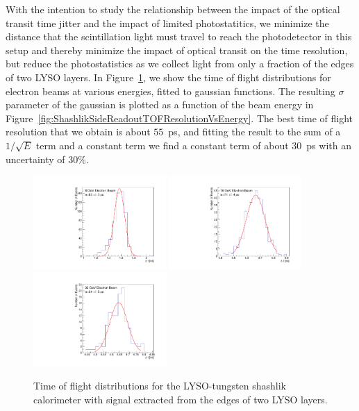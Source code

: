 \documentclass[11pt]{article}
\begin{document}
{With the intention to study the relationship between the impact of the 
optical transit time jitter and the impact of limited photostatitics,
we minimize the distance that the scintillation light
must travel to reach the photodetector in this setup and thereby minimize the
impact of optical transit on the time resolution, but reduce the photostatistics 
as we collect light from only a fraction of the edges of two LYSO layers. 
In Figure~\ref{fig:ShashlikSideReadoutTOF}, we show the 
time of flight distributions for electron beams at various energies, 
fitted to gaussian functions. The resulting
$\sigma$ parameter of the gaussian is plotted as a function of the
beam energy in Figure~\ref{fig:ShashlikSideReadoutTOFResolutionVsEnergy}.
The best time of flight resolution that we obtain is about $55$~ps, and
fitting the result to the sum of a $1/\sqrt{E}$ term and a constant term
we find a constant term of about $30$~ps with an uncertainty of $30\%$. 

\begin{figure}[h] \centering
\includegraphics[width=0.45\textwidth]{figs/TOF_ShashlikSideReadout_Electron_8GeV} 
\includegraphics[width=0.45\textwidth]{figs/TOF_ShashlikSideReadout_Electron_16GeV} 
\includegraphics[width=0.45\textwidth]{figs/TOF_ShashlikSideReadout_Electron_32GeV} 
\caption{ Time of flight distributions for the LYSO-tungsten shashlik calorimeter
with signal extracted from the edges of two LYSO layers. } 
\label{fig:ShashlikSideReadoutTOF}
\end{figure}

}
\end{document}
